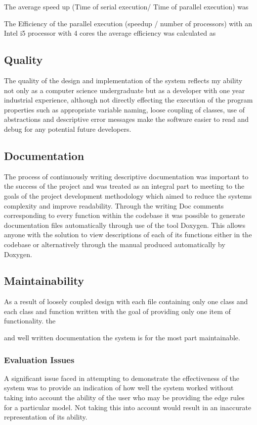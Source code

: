 \documentclass{article}
\begin{document}
The average speed up (Time of serial execution/ Time of parallel execution) was 


The Efficiency of the parallel execution (speedup / number of processors) with an Intel i5 processor with 4 cores the average efficiency  was calculated as

\subsection{Quality}
The quality of the design and implementation of the system reflects my ability not only as a computer science undergraduate but as a developer with one year industrial experience, although not directly effecting the execution of the program properties such as appropriate variable naming, loose coupling of classes, use of abstractions and descriptive error messages make the software easier to read and debug for any potential future developers.


\subsection{Documentation}
The process of continuously writing descriptive documentation was important to the success of the project and was treated as an integral part to meeting to the goals of the project development methodology which aimed to reduce the systems complexity and improve readability. Through the writing Doc comments corresponding to every function within the codebase it was possible to generate documentation files automatically through use of the tool Doxygen. This allows anyone with the solution to view descriptions of each of its functions either in the codebase or alternatively through the manual produced automatically by Doxygen.

\subsection{Maintainability}
As a result of loosely coupled design with each file containing only one class and each class and function written with the goal of providing only one item of functionality. the 

and well written documentation the system is for the most part maintainable. 


\subsubsection{Evaluation Issues}
A significant issue faced in attempting to demonstrate the effectiveness of the system was to provide an indication of how well the system worked without taking into account the ability of the user who may be providing the edge rules for a particular model. Not taking this into account would result in an inaccurate representation of its ability.
\end{document}
